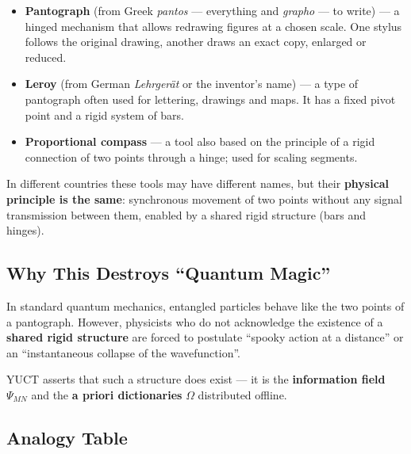 \documentclass[12pt,a4paper]{article}
\begin{document}
	\begin{itemize}
		\item \textbf{Pantograph} (from Greek \textit{pantos} — everything and \textit{grapho} — to write) — a hinged mechanism that allows redrawing figures at a chosen scale. One stylus follows the original drawing, another draws an exact copy, enlarged or reduced.
		\item \textbf{Leroy} (from German \textit{Lehrgerät} or the inventor's name) — a type of pantograph often used for lettering, drawings and maps. It has a fixed pivot point and a rigid system of bars.
		\item \textbf{Proportional compass} — a tool also based on the principle of a rigid connection of two points through a hinge; used for scaling segments.
	\end{itemize}
	
	In different countries these tools may have different names, but their \textbf{physical principle is the same}: synchronous movement of two points without any signal transmission between them, enabled by a shared rigid structure (bars and hinges).
	
	\subsection{Why This Destroys “Quantum Magic”}
	
	In standard quantum mechanics, entangled particles behave like the two points of a pantograph. However, physicists who do not acknowledge the existence of a \textbf{shared rigid structure} are forced to postulate ``spooky action at a distance'' or an ``instantaneous collapse of the wavefunction''.
	
	YUCT asserts that such a structure does exist — it is the \textbf{information field} \(\Psi_{MN}\) and the \textbf{a priori dictionaries} \(\Omega\) distributed offline.
	
	\subsection{Analogy Table}
	
\end{document}
